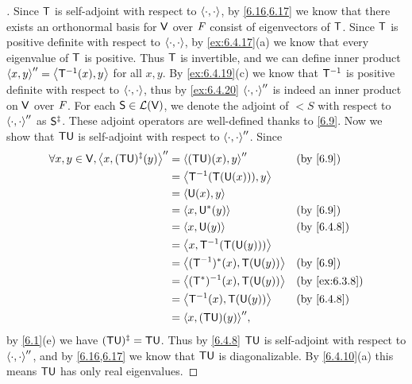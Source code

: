 \begin{proof}[]
  Since \(\mathsf{T}\) is self-adjoint with respect to \(\left\langle\cdot, \cdot\right\rangle\), by \cref{6.16,6.17} we know that there exists an orthonormal basis for \(\mathsf{V}\) over \(\mathit{F}\) consist of eigenvectors of \(\mathsf{T}\).
  Since \(\mathsf{T}\) is positive definite with respect to \(\left\langle\cdot, \cdot\right\rangle\), by \cref{ex:6.4.17}(a) we know that every eigenvalue of \(\mathsf{T}\) is positive.
  Thus \(\mathsf{T}\) is invertible, and we can define inner product \(\left\langle x, y\right\rangle'' = \left\langle\mathsf{T}^{-1}(x), y\right\rangle\) for all \(x, y\).
  By \cref{ex:6.4.19}(c) we know that \(\mathsf{T}^{-1}\) is positive definite with respect to \(\left\langle\cdot, \cdot\right\rangle\), thus by \cref{ex:6.4.20} \(\left\langle\cdot, \cdot\right\rangle''\) is indeed an inner product on \(\mathsf{V}\) over \(\mathit{F}\).
  For each \(\mathsf{S} \in \mathcal{L}(\mathsf{V})\), we denote the adjoint of \(\lt{S}\) with respect to \(\left\langle\cdot, \cdot\right\rangle''\) as \(\mathsf{S}^{\ddag}\).
  These adjoint operators are well-defined thanks to \cref{6.9}.
  Now we show that \(\mathsf{T} \mathsf{U}\) is self-adjoint with respect to \(\left\langle\cdot, \cdot\right\rangle''\).
  Since
  \begin{align*}
    \forall x, y \in \V, \inn{x, (\T \U)^{\ddag}(y)}'' & = \inn{(\T \U)(x), y}''           &  & \by{6.9}      \\
                                                       & = \inn{\T^{-1}(\T(\U(x))), y}                        \\
                                                       & = \inn{\U(x), y}                                     \\
                                                       & = \inn{x, \U^*(y)}                &  & \by{6.9}      \\
                                                       & = \inn{x, \U(y)}                  &  & \by{6.4.8}    \\
                                                       & = \inn{x, \T^{-1}(\T(\U(y)))}                        \\
                                                       & = \inn{(\T^{-1})^*(x), \T(\U(y))} &  & \by{6.9}      \\
                                                       & = \inn{(\T^*)^{-1}(x), \T(\U(y))} &  & \by{ex:6.3.8} \\
                                                       & = \inn{\T^{-1}(x), \T(\U(y))}     &  & \by{6.4.8}    \\
                                                       & = \inn{x, (\T \U)(y)}'',
  \end{align*}
  by \cref{6.1}(e) we have \((\mathsf{T} \mathsf{U})^{\ddag} = \mathsf{T} \mathsf{U}\).
  Thus by \cref{6.4.8} \(\mathsf{T} \mathsf{U}\) is self-adjoint with respect to \(\left\langle\cdot, \cdot\right\rangle''\), and by \cref{6.16,6.17} we know that \(\mathsf{T} \mathsf{U}\) is diagonalizable.
  By \cref{6.4.10}(a) this means \(\mathsf{T} \mathsf{U}\) has only real eigenvalues.
\end{proof}


